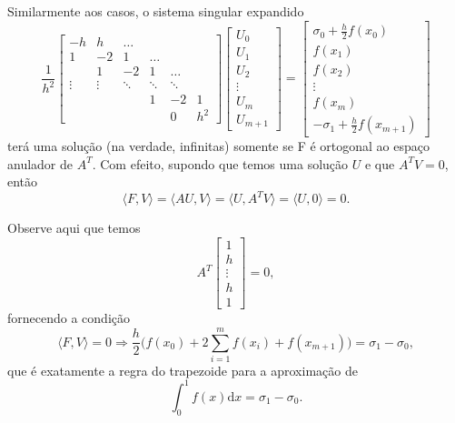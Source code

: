 \documentclass[../differential_methods.tex]{subfiles}
\begin{document}
Similarmente aos casos, o sistema singular expandido
\[
	\frac{1}{h^{2}}\begin{bmatrix}
		-h     & h      & \dotsc &        &        &       \\
		1      & -2     & 1      & \dotsc &        &       \\
		       & 1      & -2     & 1      & \dotsc &       \\
		\vdots & \vdots & \ddots & \ddots & \ddots &       \\
		       &        &        & 1      & -2     & 1     \\
		       &        &        &        & 0      & h^{2}
	\end{bmatrix} \begin{bmatrix}
		U_{0}  \\
		U_{1}  \\
		U_{2}  \\
		\vdots \\
		U_{m}  \\
		U_{m+1}
	\end{bmatrix} = \begin{bmatrix}
		\sigma_{0} + \frac{h}{2}f(x_{0}) \\
		f(x_1)                           \\
		f(x_2)                           \\
		\vdots                           \\
		f(x_{m})                         \\
		-\sigma_{1}+\frac{h}{2}f(x_{m+1})
	\end{bmatrix}
\]
terá uma solução (na verdade, infinitas) somente se F é ortogonal ao espaço anulador de \(A^{T}\). Com efeito, supondo que temos uma solução \(U\) e que \(A^{T}V=0\), então
\[
	\langle F, V \rangle = \langle AU, V \rangle = \langle U, A^{T}V \rangle = \langle U, 0 \rangle = 0.
\]
\begin{tcolorbox}[
		skin=enhanced,
		title=Observação,
		fonttitle=\bfseries,
		colframe=black,
		colbacktitle=cyan!75!white,
		colback=cyan!15,
		colbacklower=black,
		coltitle=black,
		drop fuzzy shadow,
	]
	Observe aqui que temos
	\[
		A^{T}\begin{bmatrix}
			1      \\
			h      \\
			\vdots \\
			h      \\
			1
		\end{bmatrix}=0,
	\]
	fornecendo a condição
	\[
		\langle F, V \rangle=0 \Rightarrow \frac{h}{2}\biggl(f(x_{0})+2 \sum\limits_{i=1}^{m}f(x_{i}) + f(x_{m+1})\biggr) = \sigma_1-\sigma_{0},
	\]
	que é exatamente a regra do trapezoide para a aproximação de
	\[
		\int_{0}^{1}f(x) \mathrm{d}x = \sigma_{1}-\sigma_{0}.
	\]
\end{tcolorbox}
\end{document}
